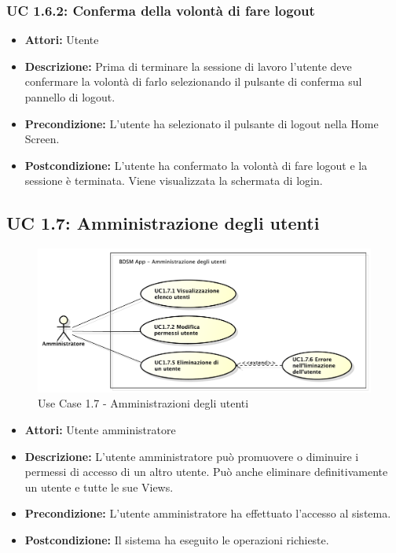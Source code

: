 \subsubsection{UC 1.6.2: Conferma della volontà di fare logout}

\begin{itemize}
    \item \textbf{Attori:} Utente
    \item \textbf{Descrizione:} Prima di terminare la sessione di lavoro l'utente deve confermare la volontà di farlo selezionando il pulsante di conferma sul pannello di logout.
    \item \textbf{Precondizione:} L'utente ha selezionato il pulsante di logout nella Home Screen.
    \item \textbf{Postcondizione:} L'utente ha confermato la volontà di fare logout e la sessione è terminata. Viene visualizzata la schermata di login.
\end{itemize}



\subsection{UC 1.7: Amministrazione degli utenti}

\begin{figure}[htbp]
    \centering
    \centerline{\includegraphics[scale=0.4]{./images/UC1_7.pdf}}
    \caption{Use Case 1.7 - Amministrazioni degli utenti}
\end{figure}

\begin{itemize}
    \item \textbf{Attori:} Utente amministratore
    \item \textbf{Descrizione:} L'utente amministratore può promuovere o diminuire i permessi di accesso di un altro utente. Può anche eliminare definitivamente un utente e tutte le sue Views.
    \item \textbf{Precondizione:} L'utente amministratore ha effettuato l'accesso al sistema.
    \item \textbf{Postcondizione:} Il sistema ha eseguito le operazioni richieste.
\end{itemize}

